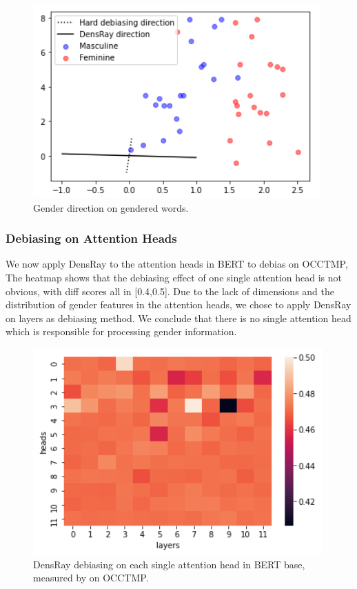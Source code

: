 

\begin{figure}[h]
	\centering
	\includegraphics[width=0.9\linewidth]{example.png}
	\caption{Gender direction on gendered words. }
\end{figure}
\subsubsection{Debiasing on Attention Heads}
We now apply DensRay to the attention heads in BERT to
debias on OCCTMP, The heatmap  shows that
the debiasing effect of one single attention head is not
obvious, with diff scores all in [0.4,0.5]. Due to the
lack of dimensions and the distribution of gender features
in the attention heads, we chose to apply DensRay on layers
as debiasing method.  We conclude that there is no single
attention head which is responsible for processing gender
information.
\begin{figure}[h]
	\centering
	\includegraphics[width=0.9\linewidth]{heatmap_heads}
	\caption{DensRay debiasing on each single attention head in BERT base, measured by  on OCCTMP.}
\end{figure}


